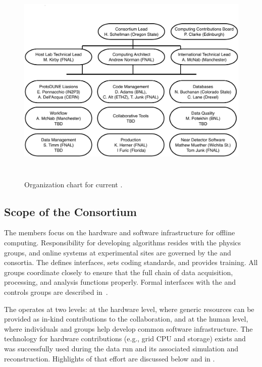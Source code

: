 \begin{figure}[htp]
\centering
\includegraphics[height=4in]{graphics/comp-org-chart.pdf}
\caption[Organization chart for current ]{Organization chart for current . }
\label{fig:ch-exec-comp-org-es}
\end{figure}

\subsection{Scope of the Consortium}
\label{ch:exec-comp-gov-scope}

The  members focus on the hardware and software infrastructure for offline computing.  Responsibility for developing algorithms resides %
with the physics groups, %
and online systems at experimental sites are governed by the  and  consortia. 
The  defines interfaces, sets coding standards, and provides training. %
All groups coordinate closely to ensure that the full chain of data acquisition, processing, and analysis %
functions properly. Formal interfaces with the  and controls groups are described in~\cite{bib:docdb7123,bib:docdb7126}. %

The  operates at two levels: at the hardware level, where generic resources can be provided as in-kind contributions to the collaboration, and at the human level, where individuals and groups help develop common software infrastructure.  The technology for hardware contributions (e.g., grid CPU and storage) exists and was successfully used during the  data run and its associated %
simulation and reconstruction. Highlights of that effort are discussed below and in \physchtools{}. %

